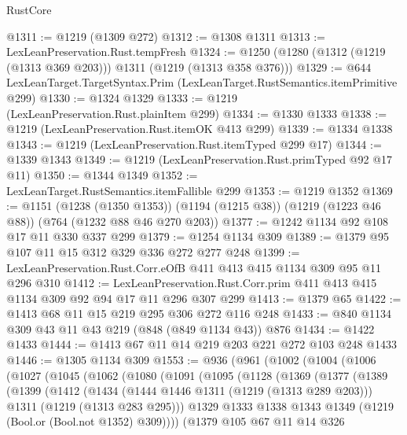 \begin{lexlean}{RustCore}
\begin{coremodule}
@1311 := @1219 (@1309 @272)
@1312 := @1308 @1311
@1313 := LexLeanPreservation.Rust.tempFresh
@1324 := @1250 (@1280 (@1312 (@1219 (@1313 @369 @203))) @1311 (@1219 (@1313 @358 @376)))
@1329 := @644 LexLeanTarget.TargetSyntax.Prim (LexLeanTarget.RustSemantics.itemPrimitive @299)
@1330 := @1324 @1329
@1333 := @1219 (LexLeanPreservation.Rust.plainItem @299)
@1334 := @1330 @1333
@1338 := @1219 (LexLeanPreservation.Rust.itemOK @413 @299)
@1339 := @1334 @1338
@1343 := @1219 (LexLeanPreservation.Rust.itemTyped @299 @17)
@1344 := @1339 @1343
@1349 := @1219 (LexLeanPreservation.Rust.primTyped @92 @17 @11)
@1350 := @1344 @1349
@1352 := LexLeanTarget.RustSemantics.itemFallible @299
@1353 := @1219 @1352
@1369 := @1151
    (@1238 (@1350 @1353))
    (@1194 (@1215 @38))
    (@1219 (@1223 @46 @88))
    (@764 (@1232 @88 @46 @270 @203))
@1377 := @1242 @1134 @92 @108 @17 @11 @330 @337 @299
@1379 := @1254 @1134 @309
@1389 := @1379 @95 @107 @11 @15 @312 @329 @336 @272 @277 @248
@1399 := LexLeanPreservation.Rust.Corr.eOfB @411 @413 @415 @1134 @309 @95 @11 @296 @310
@1412 := LexLeanPreservation.Rust.Corr.prim @411 @413 @415 @1134 @309 @92 @94 @17 @11 @296 @307 @299
@1413 := @1379 @65
@1422 := @1413 @68 @11 @15 @219 @295 @306 @272 @116 @248
@1433 := @840 @1134 @309 @43 @11 @43 @219 (@848 (@849 @1134 @43)) @876
@1434 := @1422 @1433
@1444 := @1413 @67 @11 @14 @219 @203 @221 @272 @103 @248 @1433
@1446 := @1305 @1134 @309
@1553 := @936
    (@961
      (@1002
        (@1004
          (@1006
            (@1027
              (@1045
                (@1062
                  (@1080
                    (@1091
                      (@1095
                        (@1128
                          (@1369
                            (@1377
                              (@1389
                                (@1399
                                  (@1412
                                    (@1434
                                      (@1444 @1446 @1311 (@1219 (@1313 @289 @203)))
                                      @1311
                                      (@1219 (@1313 @283 @295)))
                                    @1329
                                    @1333
                                    @1338
                                    @1343
                                    @1349
                                    (@1219 (Bool.or (Bool.not @1352) @309))))
                                (@1379
                                  @105
                                  @67
                                  @11
                                  @14
                                  @326

\end{coremodule}
\end{lexlean}
